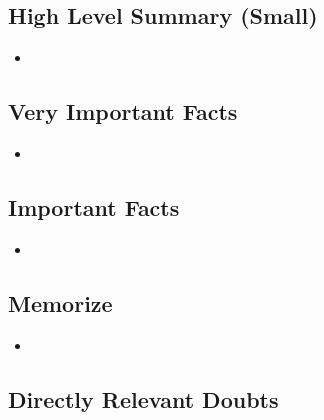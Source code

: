 \documentclass{article}
\begin{document}
\subsection{High Level Summary (Small)}

    \begin{itemize}

    \item 
    
    \end{itemize}

\subsection{Very Important Facts}

    \begin{itemize}

    \item 
    
    \end{itemize}

\subsection{Important Facts}

    \begin{itemize}

    \item 
    
    \end{itemize}

\subsection{Memorize}

    \begin{itemize}

    \item 
    
    \end{itemize}

\subsection*{Directly Relevant Doubts}
\end{document}

